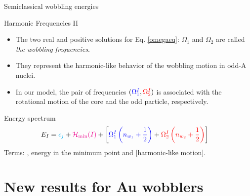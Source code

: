 \documentclass{beamer}
\begin{document}
\begin{frame}{Semiclassical wobbling energies}
\begin{block}{Harmonic Frequencies II}
\begin{itemize}
    \item The two real and positive solutions for Eq. \ref{omegaeq}: $\Omega_1$ and $\Omega_2$ are called \emph{the wobbling frequencies}.
    \item They represent the harmonic-like behavior of the wobbling motion in odd-A nuclei.
  \item In our model, the pair of frequencies $({\color{blue}\Omega_1^I},{\color{red}\Omega_{2}^I})$ is associated with the rotational motion of the {\color{blue}core} and the {\color{red}odd particle}, respectively.
\end{itemize}
\end{block}
\begin{alertblock}{Energy spectrum}
\begin{align}
    E_I&={\color{cyan}\epsilon_{j}}+{\color{magenta}\mathcal{H}_\text{min}(I)}+\left[{\color{blue}\Omega_1^I\left(n_{w_1}+\frac{1}{2}\right)}+{\color{red}\Omega_2^I\left(n_{w_2}+\frac{1}{2}\right)}\right] \label{wobbling_formula}
  \end{align} 
  Terms: {\color{cyan}{single particle energy}}, {\color{magenta}energy in the minimum point} and [harmonic-like motion].
\end{alertblock}
\end{frame}

\section{New results for Au wobblers}  
\end{document}
